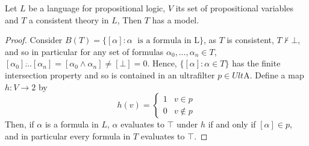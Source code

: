\documentclass[12pt]{article}
\begin{document}
\begin{theorem}
[Completeness]
Let $L$ be a language for propositional logic, $V$ its set of propositional variables and $T$ a consistent theory in $L$,
Then $T$ has a model.
\end{theorem}
\begin{proof}
Consider $B(T)=\{[\alpha]:\alpha \;\text{ is a formula in L}\}$, as $T$ is consistent, $T\not\vdash \bot$, and so in particular for any set of formulas $\alpha_0,\ldots,\alpha_n\in T$, $[\alpha_0]\dot\ldots[\alpha_n]=[\alpha_0\wedge\alpha_n]\neq[\bot]=0$. 
Hence, $\{[\alpha]:\alpha\in T\}$ has the finite intersection property and so is contained in an ultrafilter $p\in Ult$A.
Define a map $h:V\to 2$ by 
\[h(v)= \begin{cases}
1 & v\in p\\
0 & v\not\in p
\end{cases}\]
Then, if $\alpha$ is a formula in $L$, $\alpha$ evaluates to $\top$ under $h$ if and only if $[\alpha]\in p$, and in particular every formula in $T$ evaluates to $\top$.
\end{proof}
\end{document}
